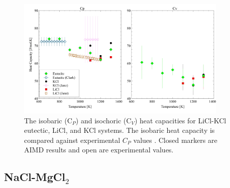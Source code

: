 \documentclass[review]{elsarticle}
\begin{document}
\begin{figure}[h]
 \centering
 \includegraphics[width=0.9\textwidth]{cv_licl-kcl.jpg} 
 \caption{The isobaric (C$_P$) and isochoric (C$_V$) heat capacities for LiCl-KCl eutectic, LiCl, and KCl systems. The isobaric heat capacity is compared against experimental $C_P$ values \cite{janz_osti,clark1973heats}. Closed markers are AIMD results and open are experimental values.}

 \label{fig:LiCl-KCl cv}
\end{figure} 

\FloatBarrier
\subsection{NaCl-MgCl$_2$}
\end{document}
